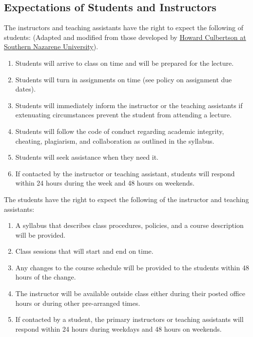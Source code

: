 \subsection{Expectations of Students and Instructors}
The instructors and teaching assistants have the right to expect the following of students:
(Adapted and modified from those developed by \href{http://home.snu.edu/~HCULBERT/contract.htm}{Howard Culbertson at Southern Nazarene University}).
\begin{enumerate}
\item Students will arrive to class on time and will be prepared for the lecture.
\item Students will turn in assignments on time (see policy on assignment due dates).
\item Students will immediately inform the instructor or the teaching assistants if extenuating circumstances prevent the student from attending a lecture.
\item Students will follow the code of conduct regarding academic integrity, cheating, plagiarism, and collaboration as outlined in the syllabus.
\item Students will seek assistance when they need it.
\item If contacted by the instructor or teaching assistant, students will respond within 24 hours during the week and 48 hours on weekends.
\end{enumerate}
The students have the right to expect the following of the instructor and teaching assistants:
\begin{enumerate}
\item A syllabus that describes class procedures, policies, and a course description will be provided.
\item Class sessions that will start and end on time.
\item Any changes to the course schedule will be provided to the students within 48 hours of the change.
\item The instructor will be available outside class either during their posted office hours or during other pre-arranged times.
\item If contacted by a student, the primary instructors or teaching assistants will respond within 24 hours during weekdays and 48 hours on weekends.
\end{enumerate}
